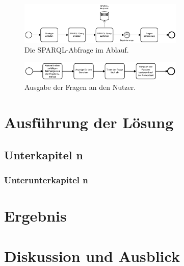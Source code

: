 \documentclass[headsepline,titlepage,ngerman,twoside,12pt]{report}
\newcommand\todo[1]{}%
\begin{document}
\begin{figure}
\centering
\includegraphics[width=0.7\textwidth]{images/sparql-gen.pdf}
\caption{Die SPARQL-Abfrage im Ablauf.}
\label{img:semanticwebstack1}
\end{figure}

\begin{figure}
\centering
\includegraphics[width=0.7\textwidth]{images/ausg-frage.pdf}
\caption{Ausgabe der Fragen an den Nutzer.}
\label{img:semanticwebstack1}
\end{figure}

\chapter{Ausführung der Lösung}
\todo{Die Ausführung der Lösung dient zur Erarbeitung von Konzepten zu den jeweiligen Ansätzen aus dem vorherigen Kapitel.}

\section{Unterkapitel n}

\subsection{Unterunterkapitel n}

\chapter{Ergebnis}
\todo{
Im Ergebniskapitel soll beschrieben werden, inwiefern Sie Ihre in 1.2/1.3 aufgestellten Ziele bzw. Aufgaben erreicht habe oder auch weshalb sie (teilweise) nicht erreicht werden konnten.
So soll es möglich sein, dass ein Leser von der Arbeit lediglich die Einleitung und die Zusammenfassung liest und doch die Ergebnisse der Arbeit erfassen kann.
Dieses Kapitel kann auch in mehrere Unterkapitel aufgeteilt werden, wenn das sinnvoll ist!
}

\chapter{Diskussion und Ausblick \todo{1--2 Seiten}}
\todo{
In der Diskussion wird das Ergebnis der Arbeit noch einmal kritisch bewertet.
Dies umfasst auch neue Probleme, die erst während der Bearbeitung erkannt wurden.
Die Eignung für ein konkretes Forschungsprojekt sollte hier diskutiert werden.
In der Diskussion kann auch die Kritik des Autors an dem stehen, was er in der Literatur zu dem zu bearbeitenden Thema hier und da gelesen hat.
Außerdem soll ein Ausblick gegeben werden, welche weiteren Fragestellungen noch bearbeitet werden sollten.
}
\end{document}
